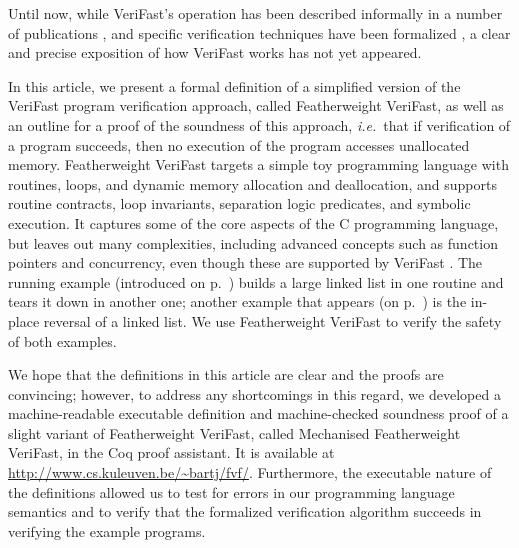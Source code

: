 \documentclass{CSML}
\theoremstyle{definition}\newtheorem{notation}[thm]{Notation}
\theoremstyle{plain}\newtheorem{satz}[thm]{Satz}
\def\ie{{\em i.e.}}
\begin{document}
Until now, while VeriFast's operation has been described informally in a 
number of publications 
\cite{verifast,DBLP:conf/nfm/JacobsSPVPP11,DBLP:series/lncs/SmansJP13}, 
and specific verification techniques have been formalized 
\cite{DBLP:conf/popl/JacobsP11,DBLP:conf/fm/JacobsSP11,DBLP:conf/forte/VogelsJPS11,DBLP:conf/sefm/VanspauwenJ13}, 
a clear and precise exposition of how VeriFast works has not yet appeared.

In this article, we present a formal definition of a simplified version of 
the VeriFast program verification approach, called Featherweight VeriFast, 
as well as an outline for a proof of the soundness of this approach, 
\ie~that if verification of a program succeeds, then no execution of the 
program accesses unallocated memory. Featherweight VeriFast targets a 
simple toy programming language with routines, loops, and dynamic memory allocation 
and deallocation, and supports routine contracts, loop invariants, 
separation logic predicates, and symbolic execution. It captures some of the core aspects of the C programming language, but leaves out many complexities, including advanced concepts such as function pointers and concurrency, even though these are supported by VeriFast \cite{DBLP:conf/popl/JacobsP11,DBLP:conf/fm/JacobsSP11}. The running example (introduced on p.~\pageref{fig:example-program})
builds a large linked list in one routine and tears it down in another 
one; another example that appears (on p.~\pageref{listing:reverse}) is the in-place reversal of a linked list.
We use Featherweight VeriFast to verify the safety of both examples.

We hope that the definitions in this article are clear and the proofs are convincing;
however, to address any shortcomings in this regard,
we developed a machine-readable
executable definition and machine-checked soundness proof
of a slight variant of Featherweight VeriFast, called
Mechanised Featherweight VeriFast, in the Coq proof assistant. It is available at \url{http://www.cs.kuleuven.be/~bartj/fvf/}.
Furthermore, the executable nature of the definitions allowed us to test for errors in our programming language semantics and to verify that the formalized verification algorithm succeeds in verifying the example programs.
\end{document}

